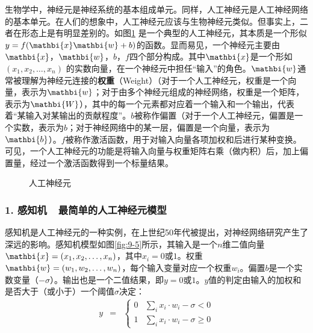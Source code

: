 \parinterval 生物学中，神经元是神经系统的基本组成单元。同样，人工神经元是人工神经网络的基本单元。在人们的想象中，人工神经元应该与生物神经元类似。但事实上，二者在形态上是有明显差别的。如图\ref{fig:9-4} 是一个典型的人工神经元，其本质是一个形似$ y=f({\mathbi{x}}{\mathbi{w}}+b) $的函数。显而易见，一个神经元主要由$ {\mathbi{x}} $，$ {\mathbi{w}} $，$ b $，$ f $四个部分构成。其中$ {\mathbi{x}} $是一个形如$ (x_1,x_2,\dots,x_n) $ 的实数向量，在一个神经元中担任“输入”的角色。$ {\mathbi{w}} $通常被理解为神经元连接的{\small\sffamily\bfseries{权重}}（Weight）（对于一个人工神经元，权重是一个向量，表示为$ {\mathbi{w}} $；对于由多个神经元组成的神经网络，权重是一个矩阵，表示为$ {\mathbi{W}} $），其中的每一个元素都对应着一个输入和一个输出，代表着“某输入对某输出的贡献程度”。$ b $被称作偏置（对于一个人工神经元，偏置是一个实数，表示为$b$；对于神经网络中的某一层，偏置是一个向量，表示为${\mathbi{b}}$）。$ f $被称作激活函数，用于对输入向量各项加权和后进行某种变换。可见，一个人工神经元的功能是将输入向量与权重矩阵右乘（做内积）后，加上偏置量，经过一个激活函数得到一个标量结果。

\begin{figure}[htp]
\centering

\caption{人工神经元}
\label{fig:9-4}
\end{figure}


\vspace{-0.5em}
\subsubsection{1. 感知机\ \dash \ 最简单的人工神经元模型}

\vspace{0.5em}
\parinterval 感知机是人工神经元的一种实例，在上世纪50年代被提出，对神经网络研究产生了深远的影响。感知机模型如图\ref {fig:9-5}所示，其输入是一个$n$维二值向量$ {\mathbi{x}}=(x_1,x_2,\dots,x_n) $，其中$ x_i=0 $或$ 1 $。权重${\mathbi{w}}=(w_1,w_2,\dots,w_n) $，每个输入变量对应一个权重$ w_i $。偏置$ b $是一个实数变量（$ -\sigma $）。输出也是一个二值结果，即$ y=0 $或$ 1 $。$ y $值的判定由输入的加权和是否大于（或小于）一个阈值$ \sigma $决定：
\begin{eqnarray}
y&=&\begin{cases} 0 & \sum_{i}{x_i\cdot w_i}-\sigma <0\\1 & \sum_{i}{x_i\cdot w_i}-\sigma \geqslant 0\end{cases}
\label{eq:9-19}
\end{eqnarray}

